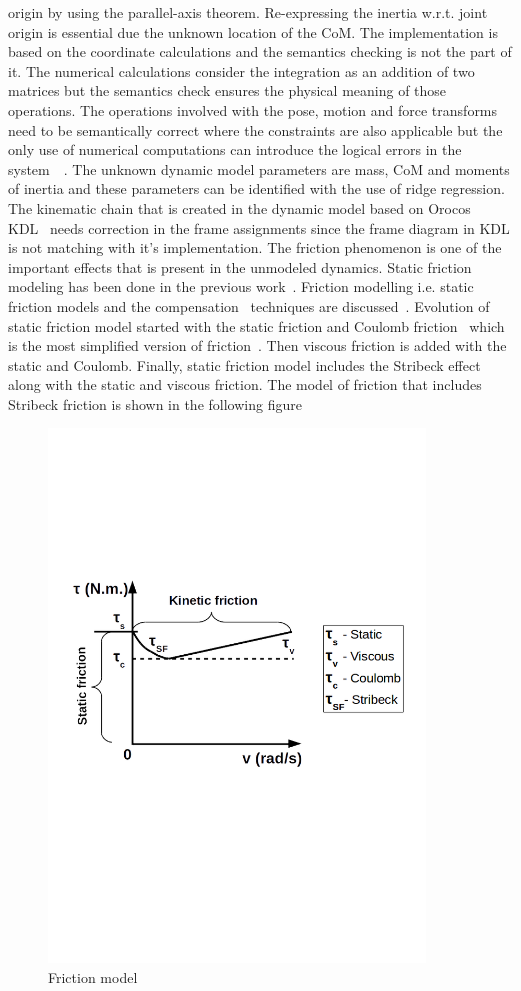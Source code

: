 origin by using the parallel-axis theorem. Re-expressing the inertia w.r.t. joint origin is essential due the unknown location of the CoM. The implementation is based on the coordinate calculations and the semantics checking is not the part of it. The numerical calculations consider the integration as an addition of two matrices but the semantics check ensures the physical meaning of those operations. The operations involved with the pose, motion and force transforms need to be semantically correct where the constraints are also applicable but the only use of numerical computations can introduce the logical errors in the system~\cite{geometicsemanticspart1}~\cite{geometicsemanticspart2}. The unknown dynamic model parameters are mass, CoM and moments of inertia and these parameters can be identified with the use of ridge regression. The kinematic chain that is created in the dynamic model based on Orocos KDL~\cite{smits2011kdl} needs correction in the frame assignments since the frame diagram in KDL is not matching with it's implementation. The friction phenomenon is one of the important effects that is present in the unmodeled dynamics. Static friction modeling has been done in the previous work~\cite{RnD2Rajagopal}. Friction modelling i.e. static friction models and the compensation~\cite{friction} techniques are discussed~\cite{corberan2012haptic}. Evolution of static friction model started with the static friction and Coulomb friction~\cite{olsson1998friction} which is the most simplified version of friction~\cite{swevers}. Then viscous friction is added with the static and Coulomb. Finally, static friction model includes the Stribeck effect along with the static and viscous friction. The model of friction that includes Stribeck friction is shown in the following figure

\begin{figure}[h]
\centering
\includegraphics[width=100mm, trim=0 320 0 220]{pictures/friction_soa}
\caption{Friction model}
\end{figure}

